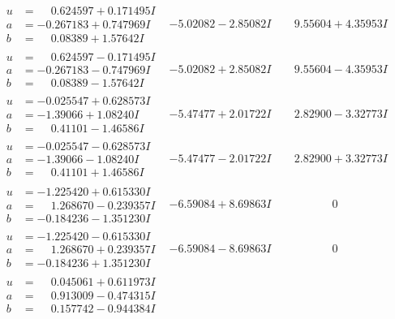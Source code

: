 \documentclass[1p]{elsarticle_modified}
\theoremstyle{definition}
\begin{document}
$$\begin{array}{c|c|c}
\begin{aligned}
u &= \phantom{-}0.624597 + 0.171495 I \\
a &= -0.267183 + 0.747969 I \\
b &= \phantom{-}0.08389 + 1.57642 I\end{aligned}
 & -5.02082 - 2.85082 I & \phantom{-}9.55604 + 4.35953 I \\ \hline\begin{aligned}
u &= \phantom{-}0.624597 - 0.171495 I \\
a &= -0.267183 - 0.747969 I \\
b &= \phantom{-}0.08389 - 1.57642 I\end{aligned}
 & -5.02082 + 2.85082 I & \phantom{-}9.55604 - 4.35953 I \\ \hline\begin{aligned}
u &= -0.025547 + 0.628573 I \\
a &= -1.39066 + 1.08240 I \\
b &= \phantom{-}0.41101 - 1.46586 I\end{aligned}
 & -5.47477 + 2.01722 I & \phantom{-}2.82900 - 3.32773 I \\ \hline\begin{aligned}
u &= -0.025547 - 0.628573 I \\
a &= -1.39066 - 1.08240 I \\
b &= \phantom{-}0.41101 + 1.46586 I\end{aligned}
 & -5.47477 - 2.01722 I & \phantom{-}2.82900 + 3.32773 I \\ \hline\begin{aligned}
u &= -1.225420 + 0.615330 I \\
a &= \phantom{-}1.268670 - 0.239357 I \\
b &= -0.184236 - 1.351230 I\end{aligned}
 & -6.59084 + 8.69863 I & \phantom{-0.000000 } 0 \\ \hline\begin{aligned}
u &= -1.225420 - 0.615330 I \\
a &= \phantom{-}1.268670 + 0.239357 I \\
b &= -0.184236 + 1.351230 I\end{aligned}
 & -6.59084 - 8.69863 I & \phantom{-0.000000 } 0 \\ \hline\begin{aligned}
u &= \phantom{-}0.045061 + 0.611973 I \\
a &= \phantom{-}0.913009 - 0.474315 I \\
b &= \phantom{-}0.157742 - 0.944384 I\end{aligned}

\end{array}$$
\end{document}
